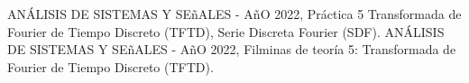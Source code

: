 \documentclass[letterpaper, 10 pt, conference]{ieeeconf}  %
\begin{document}
\begin{thebibliography}{99}

ANÁLISIS DE SISTEMAS Y SE\~{n}ALES - A\~{n}O 2022, Práctica 5 Transformada de Fourier de Tiempo Discreto (TFTD), Serie Discreta Fourier (SDF).
ANÁLISIS DE SISTEMAS Y SE\~{n}ALES - A\~{n}O 2022, Filminas de teor\'ia 5: Transformada de Fourier de Tiempo Discreto (TFTD).

\end{thebibliography}
\end{document}

